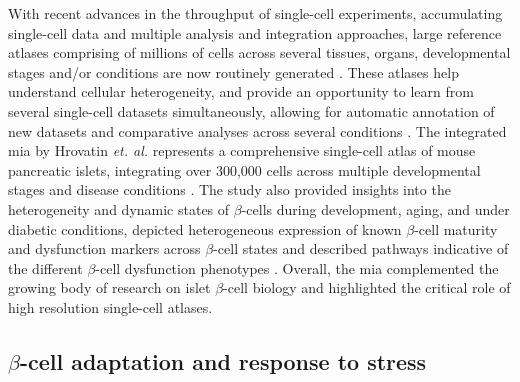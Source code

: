 \par With recent advances in the throughput of single-cell experiments, accumulating single-cell data and multiple analysis and integration approaches, large reference atlases comprising of millions of cells across several tissues, organs, developmental stages and/or conditions are now routinely generated \textbf{\cite{regev_human_nodate}}. These atlases help understand cellular heterogeneity, and provide an opportunity to learn from several single-cell datasets simultaneously, allowing for automatic annotation of new datasets and comparative analyses across several conditions \textbf{\cite{rood_impact_2022,lotfollahi_mapping_2021}}. The integrated \gls{mia} by Hrovatin \textit{et. al.} represents a comprehensive single-cell atlas of mouse pancreatic islets, integrating over 300,000 cells across multiple developmental stages and disease conditions \textbf{\cite{hrovatin_delineating_2023}}. The study also provided insights into the heterogeneity and dynamic states of $\beta$-cells during development, aging, and under diabetic conditions, depicted heterogeneous expression of known $\beta$-cell maturity and dysfunction markers across $\beta$-cell states and described pathways indicative of the different $\beta$-cell dysfunction phenotypes \textbf{\cite{hrovatin_delineating_2023}}. Overall, the \gls{mia} complemented the growing body of research on islet $\beta$-cell biology and highlighted the critical role of high resolution single-cell atlases.

\clearpage

\subsection{$\beta$-cell adaptation and response to stress}


